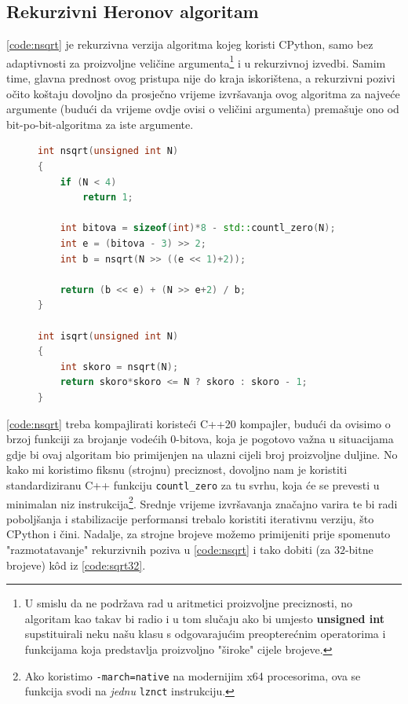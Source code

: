 \documentclass[12pt]{scrartcl}
\begin{document}
\subsection{Rekurzivni Heronov algoritam}
\autoref{code:nsqrt} je rekurzivna verzija algoritma kojeg koristi CPython, samo bez adaptivnosti za proizvoljne veličine argumenta\footnote{U smislu
da ne podržava rad u aritmetici proizvoljne preciznosti, no algoritam kao takav bi radio i u tom slučaju ako bi umjesto \textbf{unsigned int} supstituirali
neku našu klasu s odgovarajućim preopterećnim operatorima i funkcijama koja predstavlja proizvoljno "široke" cijele brojeve.} 
i u rekurzivnoj izvedbi.
Samim time, glavna prednost ovog pristupa nije do kraja iskorištena, a rekurzivni pozivi očito koštaju dovoljno da prosječno vrijeme izvršavanja
ovog algoritma za najveće argumente (budući da vrijeme ovdje ovisi o veličini argumenta) premašuje ono od bit-po-bit-algoritma za iste argumente.
\begin{figure}[h]
\begin{lstlisting}[language=C++, label=code:nsqrt, caption=Rekurzivna Heronova metoda u C++20]
int nsqrt(unsigned int N)
{
    if (N < 4)
        return 1;

    int bitova = sizeof(int)*8 - std::countl_zero(N);
    int e = (bitova - 3) >> 2;
    int b = nsqrt(N >> ((e << 1)+2));

    return (b << e) + (N >> e+2) / b;
}

int isqrt(unsigned int N)
{
    int skoro = nsqrt(N);
    return skoro*skoro <= N ? skoro : skoro - 1;
}
\end{lstlisting}
\end{figure}
\autoref{code:nsqrt} treba kompajlirati koristeći C++20 kompajler, budući da ovisimo o brzoj funkciji za brojanje vodećih $0$-bitova, koja je pogotovo
važna u situacijama gdje bi ovaj algoritam bio primijenjen na ulazni cijeli broj proizvoljne duljine. No kako mi koristimo fiksnu (strojnu) preciznost,
dovoljno nam je koristiti standardiziranu C++ funkciju \texttt{countl\_zero} za tu svrhu, koja će se prevesti u minimalan niz instrukcija\footnote{Ako
koristimo \texttt{-march=native} na modernijim x64 procesorima, ova se funkcija svodi na \emph{jednu} \texttt{lznct} instrukciju.}.
Srednje vrijeme izvršavanja značajno varira te bi radi poboljšanja i stabilizacije performansi trebalo koristiti iterativnu verziju,
što CPython i čini. Nadalje, za strojne brojeve možemo
primijeniti prije spomenuto "razmotatavanje" rekurzivnih poziva
u \autoref{code:nsqrt} i tako dobiti (za $32$-bitne brojeve) k\^od iz \autoref{code:sqrt32}.
\end{document}
